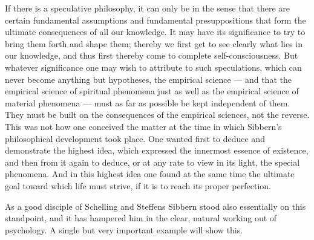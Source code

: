 \documentclass[12pt,a4paper,openany]{book}
\newcommand{\opage}[1]{\marginnote{\footnotesize\textit{[#1]}}}
\begin{document}
If there is a speculative philosophy, it can only
be in the sense that there are certain fundamental assumptions and
fundamental presuppositions that form the ultimate consequences of
\opage{77}all our knowledge. It may have its significance to try to
bring them forth and shape them; thereby we first get to see clearly
what lies in our knowledge, and thus first thereby come
to complete self-consciousness. But whatever significance one
may wish to attribute to such speculations, which can never
become anything but hypotheses, the empirical science ---
and that the empirical science of spiritual phenomena
just as well as the empirical science of material
phenomena --- must as far as possible be kept independent of them. They must be
built on the consequences of the empirical sciences, not
the reverse. This was not how one conceived the matter at the
time in which Sibbern's philosophical development took place. One
wanted first to deduce and demonstrate the highest idea, which expressed
the innermost essence of existence, and then from it again to deduce, or
at any rate to view in its light, the special phenomena.
And in this highest idea one found at the same time the ultimate
goal toward which life must strive, if it is to reach
its proper perfection.

As a good disciple of Schelling and Steffens Sibbern stood
also essentially on this standpoint, and it has
hampered him in the clear, natural working out of
psychology. A single but very important example will
show this.
\end{document}
